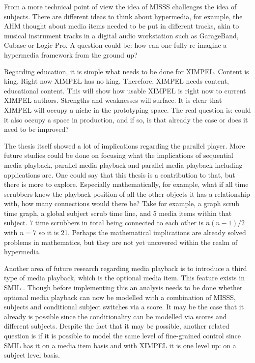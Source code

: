 From a more technical point of view the idea of MISSS challenges the idea of subjects. There are different ideas to think about hypermedia, for example, the AHM thought about media items needed to be put in different tracks, akin to musical instrument tracks in a digital audio workstation such as GarageBand, Cubase or Logic Pro. A question could be: how can one fully re-imagine a hypermedia framework from the ground up?

Regarding education, it is simple what needs to be done for XIMPEL. Content is king. Right now XIMPEL has no king. Therefore, XIMPEL needs content, educational content. This will show how usable XIMPEL is right now to current XIMPEL authors. Strengths and weaknesses will surface. It is clear that XIMPEL will occupy a niche in the prototyping space. The real question is: could it also occupy a space in production, and if so, is that already the case or does it need to be improved?

The thesis itself showed a lot of implications regarding the parallel player. More future studies could be done on focusing what the implications of sequential media playback, parallel media playback and parallel media playback including applications are. One could say that this thesis is a contribution to that, but there is more to explore. Especially mathematically, for example, what if all time scrubbers knew the playback position of all the other objects it has a relationship with, how many connections would there be? Take for example, a graph scrub time graph, a global subject scrub time line, and 5 media items within that subject. 7 time scrubbers in total being connected to each other is $n(n-1)/2$ with $n=7$ so it is 21. Perhaps the mathematical implications are already solved problems in mathematics, but they are not yet uncovered within the realm of hypermedia.

Another area of future research regarding media playback is to introduce a third type of media playback, which is the optional media item. This feature exists in SMIL \cite{SMIL_lecture}. Though before implementing this an analysis needs to be done whether optional media playback can now be modelled with a combination of MISSS, subjects and conditional subject switches via a score. It may be the case that it already is possible since the conditionality can be modelled via scores and different subjects. Despite the fact that it may be possible, another related question is if it is possible to model the same level of fine-grained control since SMIL has it on a media item basis and with XIMPEL it is one level up: on a subject level basis.

